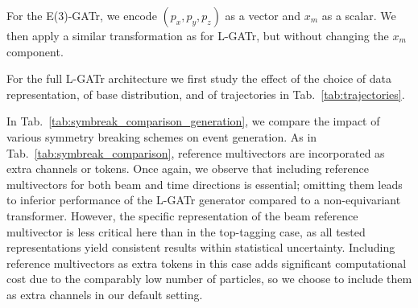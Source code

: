 \documentclass[submission, Phys]{SciPost}
\begin{document}
For the E(3)-GATr, we encode $(p_x, p_y, p_z)$ as a vector and $x_m$ as a scalar. We then apply a similar transformation as for L-GATr, but without changing the $x_m$ component.

For the full L-GATr architecture we first study the effect of the choice of data representation, of base distribution, and of trajectories in Tab.~\ref{tab:trajectories}.

In Tab.~\ref{tab:symbreak_comparison_generation}, we compare the impact of various symmetry breaking schemes on event generation. As in Tab.~\ref{tab:symbreak_comparison}, reference multivectors are incorporated as extra channels or tokens. Once again, we observe that including reference multivectors for both beam and time directions is essential; omitting them leads to inferior performance of the L-GATr generator compared to a non-equivariant transformer. However, the specific representation of the beam reference multivector is less critical here than in the top-tagging case, as all tested representations yield consistent results within statistical uncertainty. Including reference multivectors as extra tokens in this case adds significant computational cost due to the comparably low number of particles, so we choose to include them as extra channels in our default setting.
\end{document}
